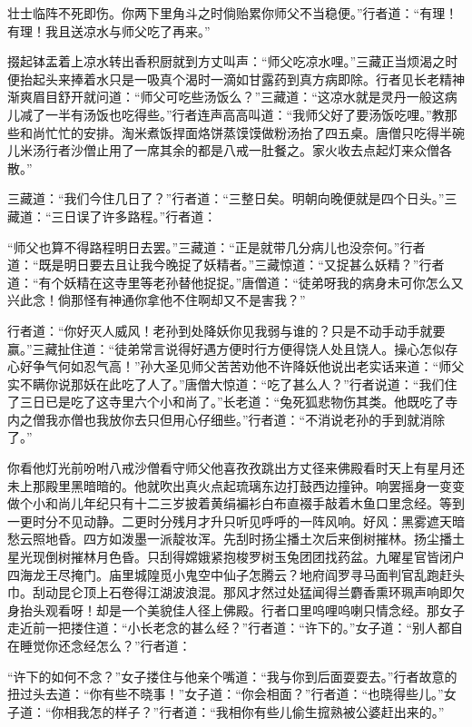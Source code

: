 \documentclass[12pt,UTF8]{ctexbook}
\begin{document}
{	壮士临阵不死即伤。你两下里角斗之时倘贻累你师父不当稳便。”行者道：“有理！有理！我且送凉水与师父吃了再来。”
	
	掇起钵盂着上凉水转出香积厨就到方丈叫声：“师父吃凉水哩。”三藏正当烦渴之时便抬起头来捧着水只是一吸真个渴时一滴如甘露药到真方病即除。行者见长老精神渐爽眉目舒开就问道：“师父可吃些汤饭么？”三藏道：“这凉水就是灵丹一般这病儿减了一半有汤饭也吃得些。”行者连声高高叫道：“我师父好了要汤饭吃哩。”教那些和尚忙忙的安排。淘米煮饭捍面烙饼蒸馍馍做粉汤抬了四五桌。唐僧只吃得半碗儿米汤行者沙僧止用了一席其余的都是八戒一肚餐之。家火收去点起灯来众僧各散。”
	
	三藏道：“我们今住几日了？”行者道：“三整日矣。明朝向晚便就是四个日头。”三藏道：“三日误了许多路程。”行者道：
	
	“师父也算不得路程明日去罢。”三藏道：“正是就带几分病儿也没奈何。”行者道：“既是明日要去且让我今晚捉了妖精者。”三藏惊道：“又捉甚么妖精？”行者道：“有个妖精在这寺里等老孙替他捉捉。”唐僧道：“徒弟呀我的病身未可你怎么又兴此念！倘那怪有神通你拿他不住啊却又不是害我？”
	
	行者道：“你好灭人威风！老孙到处降妖你见我弱与谁的？只是不动手动手就要赢。”三藏扯住道：“徒弟常言说得好遇方便时行方便得饶人处且饶人。操心怎似存心好争气何如忍气高！”孙大圣见师父苦苦劝他不许降妖他说出老实话来道：“师父实不瞒你说那妖在此吃了人了。”唐僧大惊道：“吃了甚么人？”行者说道：“我们住了三日已是吃了这寺里六个小和尚了。”长老道：“兔死狐悲物伤其类。他既吃了寺内之僧我亦僧也我放你去只但用心仔细些。”行者道：“不消说老孙的手到就消除了。”
	
	你看他灯光前吩咐八戒沙僧看守师父他喜孜孜跳出方丈径来佛殿看时天上有星月还未上那殿里黑暗暗的。他就吹出真火点起琉璃东边打鼓西边撞钟。响罢摇身一变变做个小和尚儿年纪只有十二三岁披着黄绢褊衫白布直裰手敲着木鱼口里念经。等到一更时分不见动静。二更时分残月才升只听见呼呼的一阵风响。好风：黑雾遮天暗愁云照地昏。四方如泼墨一派靛妆浑。先刮时扬尘播土次后来倒树摧林。扬尘播土星光现倒树摧林月色昏。只刮得嫦娥紧抱梭罗树玉兔团团找药盆。九曜星官皆闭户四海龙王尽掩门。庙里城隍觅小鬼空中仙子怎腾云？地府阎罗寻马面判官乱跑赶头巾。刮动昆仑顶上石卷得江湖波浪混。那风才然过处猛闻得兰麝香熏环珮声响即欠身抬头观看呀！却是一个美貌佳人径上佛殿。行者口里呜哩呜喇只情念经。那女子走近前一把搂住道：“小长老念的甚么经？”行者道：“许下的。”女子道：“别人都自在睡觉你还念经怎么？”行者道：
	
	“许下的如何不念？”女子搂住与他亲个嘴道：“我与你到后面耍耍去。”行者故意的扭过头去道：“你有些不晓事！”女子道：“你会相面？”行者道：“也晓得些儿。”女子道：“你相我怎的样子？”行者道：“我相你有些儿偷生搲熟被公婆赶出来的。”
	
}
\end{document}

